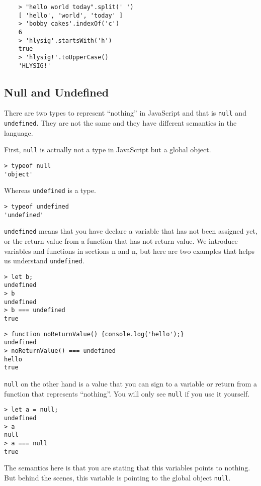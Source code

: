 \begin{lstlisting}
    > "hello world today".split(' ')
    [ 'hello', 'world', 'today' ]
    > 'bobby cakes'.indexOf('c')
    6
    > 'hlysig'.startsWith('h')
    true
    > 'hlysig!'.toUpperCase()
    'HLYSIG!'
\end{lstlisting}


\subsection{Null and Undefined}
There are two types to represent ``nothing'' in JavaScript and that is \texttt{null} and \texttt{undefined}. They are not the same and they have different semantics in the language.

First, \texttt{null} is actually not a type in JavaScript but a global object.

\begin{lstlisting}
> typeof null
'object'
\end{lstlisting}

Whereas \texttt{undefined} is a type.

\begin{lstlisting}
> typeof undefined
'undefined'
\end{lstlisting}

\texttt{undefined} means that you have declare a variable that has not been assigned yet, or the return value from a function that has not return value. We introduce variables and functions in sections n and n, but here are two examples that helps us understand \texttt{undefined}.

\begin{lstlisting}
> let b;
undefined
> b
undefined
> b === undefined
true
\end{lstlisting}

\begin{lstlisting}
> function noReturnValue() {console.log('hello');}
undefined
> noReturnValue() === undefined
hello
true
\end{lstlisting}

\texttt{null} on the other hand is a value that you can sign to a variable or return from a function that represents ``nothing''. You will only see \texttt{null} if you use it yourself.

\begin{lstlisting}
> let a = null;
undefined
> a
null
> a === null
true
\end{lstlisting}

The semantics here is that you are stating that this variables points to nothing. But behind the scenes, this variable is pointing to the global object \texttt{null}.

